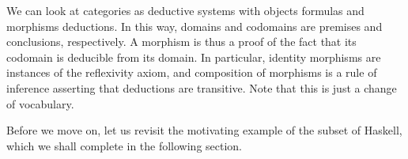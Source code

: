 \begin{example}
  \label{ex:category-deductive-system}



  We can look at categories as deductive systems with objects formulas
  and morphisms deductions. In this way, domains and co\-do\-mains are
  premises and conclusions, respectively. A morphism is thus a proof
  of the fact that its codomain is deducible from its domain. In
  particular, identity morphisms are instances of the reflexivity
  axiom, and composition of morphisms is a rule of inference asserting
  that deductions are transitive. Note that this is just a change of
  vocabulary.

\end{example}

Before we move on, let us revisit the motivating example of the subset
of Haskell, which we shall complete in the following section.

